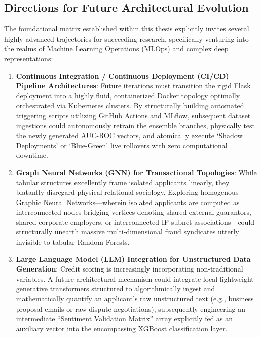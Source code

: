 \hypertarget{directions-for-future-architectural-evolution}{%
\subsection{Directions for Future Architectural
Evolution}\label{directions-for-future-architectural-evolution}}

The foundational matrix established within this thesis explicitly
invites several highly advanced trajectories for succeeding research,
specifically venturing into the realms of Machine Learning Operations
(MLOps) and complex deep representations:

\begin{enumerate}
\def\labelenumi{\arabic{enumi}.}
\tightlist
\item
  \textbf{Continuous Integration / Continuous Deployment (CI/CD)
  Pipeline Architectures}: Future iterations must transition the rigid
  Flask deployment into a highly fluid, containerized Docker topology
  optimally orchestrated via Kubernetes clusters. By structurally
  building automated triggering scripts utilizing GitHub Actions and
  MLflow, subsequent dataset ingestions could autonomously retrain the
  ensemble branches, physically test the newly generated AUC-ROC
  vectors, and atomically execute `Shadow Deployments' or `Blue-Green'
  live rollovers with zero computational downtime.
\item
  \textbf{Graph Neural Networks (GNN) for Transactional Topologies}:
  While tabular structures excellently frame isolated applicants
  linearly, they blatantly disregard physical relational sociology.
  Exploring homogenous Graphic Neural Networks---wherein isolated
  applicants are computed as interconnected nodes bridging vertices
  denoting shared external guarantors, shared corporate employers, or
  interconnected IP subnet associations---could structurally unearth
  massive multi-dimensional fraud syndicates utterly invisible to
  tabular Random Forests.
\item
  \textbf{Large Language Model (LLM) Integration for Unstructured Data
  Generation}: Credit scoring is increasingly incorporating
  non-traditional variables. A future architectural mechanism could
  integrate local lightweight generative transformers structured to
  algorithmically ingest and mathematically quantify an applicant's raw
  unstructured text (e.g., business proposal emails or raw dispute
  negotiations), subsequently engineering an intermediate ``Sentiment
  Validation Matrix'' array explicitly fed as an auxiliary vector into
  the encompassing XGBoost classification layer.
\end{enumerate}

